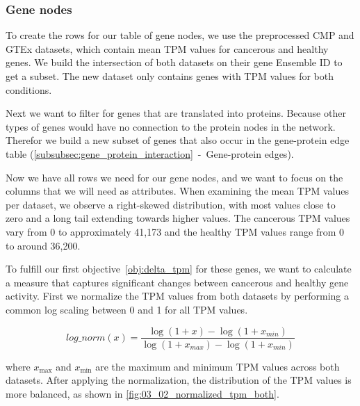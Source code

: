 \subsubsection*{Gene nodes} \label{subsubsec:gene_nodes}

To create the rows for our table of gene nodes, we use the preprocessed CMP and GTEx datasets,
which contain mean TPM values for cancerous and healthy genes.
We build the intersection of both datasets on their gene Ensemble ID to get a subset.
The new dataset only contains genes with TPM values for both conditions.

Next we want to filter for genes that are translated into proteins.
Because other types of genes would have no connection to the protein nodes in the network.
Therefor we build a new subset of genes that also occur in the gene-protein edge table (\ref{subsubsec:gene_protein_interaction}~-~Gene-protein edges).

Now we have all rows we need for our gene nodes, and we want to focus on the columns that we will need as attributes.
When examining the mean TPM values per dataset, we observe a right-skewed distribution, with most values close to zero
and a long tail extending towards higher values.
The cancerous TPM values vary from 0 to approximately 41,173 and the healthy TPM values range from 0 to around 36,200.

To fulfill our first objective~\ref{obj:delta_tpm} for these genes,
we want to calculate a measure that captures significant changes between cancerous and healthy gene activity.
First we normalize the TPM values from both datasets by performing a common log scaling between 0 and 1 for all TPM values.

\begin{equation}
\label{eq:tpm_normalization}
log\_norm(x) = \frac{\log(1 + x) - \log(1 + x_{min})}{\log(1 + x_{max}) - \log(1 + x_{min})}
\end{equation}

where $x_{\max}$ and $x_{\min}$ are the maximum and minimum TPM values across both datasets.
After applying the normalization, the distribution of the TPM values is more balanced, as shown in \cref{fig:03_02_normalized_tpm_both}.

